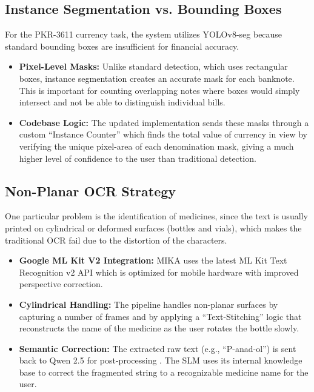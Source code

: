 \documentclass[12pt,a4paper]{report}
\begin{document}
\subsection{Instance Segmentation vs. Bounding Boxes}
For the PKR-3611 currency task, the system utilizes YOLOv8-seg because standard bounding boxes are insufficient for financial accuracy.
 
\begin{itemize}
    \item[1.] \textbf{Pixel-Level Masks:} Unlike standard detection, which uses rectangular boxes, instance segmentation creates an accurate mask for each banknote. This is important for counting overlapping notes where boxes would simply intersect and not be able to distinguish individual bills. 
 
    \item[2.] \textbf{Codebase Logic:} The updated implementation sends these masks through a custom “Instance Counter” which finds the total value of currency in view by verifying the unique pixel-area of each denomination mask, giving a much higher level of confidence to the user than traditional detection.
\end{itemize}
 
\subsection{Non-Planar OCR Strategy}
One particular problem is the identification of medicines, since the text is usually printed on cylindrical or deformed surfaces (bottles and vials), which makes the traditional OCR fail due to the distortion of the characters. 
 
\begin{itemize}
    \item[1.] \textbf{Google ML Kit V2 Integration:} MIKA uses the latest ML Kit Text Recognition v2 API which is optimized for mobile hardware with improved perspective correction. 
    \item[2.] \textbf{Cylindrical Handling:} The pipeline handles non-planar surfaces by capturing a number of frames and by applying a “Text-Stitching” logic that reconstructs the name of the medicine as the user rotates the bottle slowly. 
    \item[3.] \textbf{Semantic Correction:} The extracted raw text (e.g., “P-anad-ol”) is sent back to Qwen 2.5 for post-processing . The SLM uses its internal knowledge base to correct the fragmented string to a recognizable medicine name for the user.
\end{itemize}
 
\end{document}
